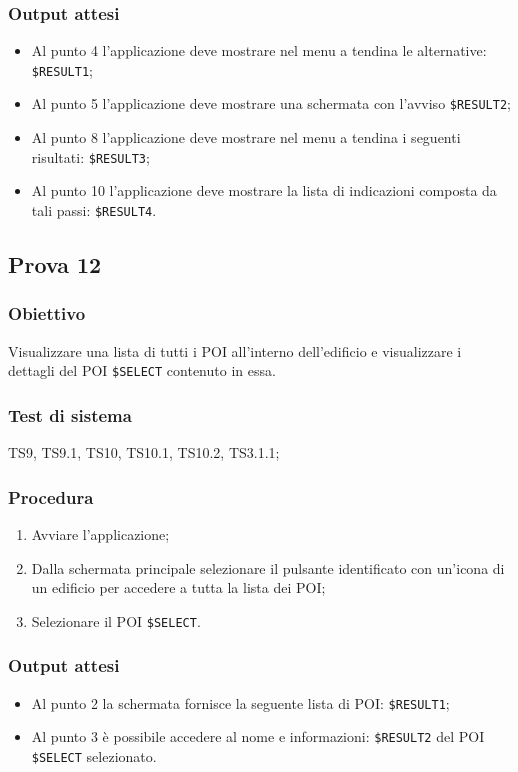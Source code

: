 \documentclass[../SperimentazioniPratiche.tex]{subfiles}
\begin{document}
	\subsubsection{Output attesi}
		\begin{itemize}
		\item Al punto 4 l'applicazione deve mostrare nel menu a tendina le alternative:  \verb|$RESULT1|;
		\item Al punto 5 l'applicazione deve mostrare una schermata con l'avviso \verb|$RESULT2|;
		\item Al punto 8 l'applicazione deve mostrare nel menu a tendina i seguenti risultati:  \verb|$RESULT3|;
		\item Al punto 10 l'applicazione deve mostrare la lista di indicazioni composta da tali passi:  \verb|$RESULT4|.
		\end{itemize}

	


\newpage	
\subsection{Prova 12} %
\label{subsec:Prova12}
	
	\subsubsection{Obiettivo}
		Visualizzare una lista di tutti i POI all'interno dell'edificio e visualizzare i dettagli del POI \verb|$SELECT| contenuto in essa.
		
	\subsubsection{Test di sistema}
		TS9, TS9.1,
		TS10, TS10.1, TS10.2,
		TS3.1.1;

	\subsubsection{Procedura}
		\begin{enumerate}
		\item Avviare l'applicazione;
		\item Dalla schermata principale selezionare il pulsante identificato con un'icona di un edificio per accedere a tutta la lista dei POI;
		\item Selezionare il POI \verb|$SELECT|.
		\end{enumerate}
		
	\subsubsection{Output attesi}
		\begin{itemize}
		\item Al punto 2 la schermata fornisce la seguente lista di POI:  \verb|$RESULT1|;
		\item Al punto 3 è possibile accedere al nome e informazioni:  \verb|$RESULT2| del POI  \verb|$SELECT| selezionato.
		\end{itemize}
	
\end{document}
